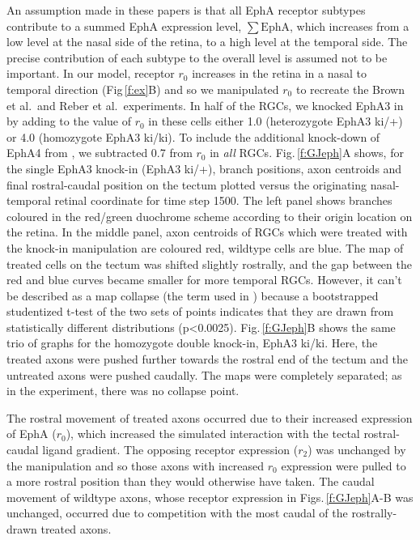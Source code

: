 \documentclass[11pt, a4paper]{article}
\begin{document}
An assumption made in these papers is that all EphA receptor subtypes contribute to a summed EphA expression level, $\sum\mathrm{EphA}$, which increases from a low level at the nasal side of the retina, to a high level at the temporal side.
The precise contribution of each subtype to the overall level is assumed not to be important.
In our model, receptor $r_0$ increases in the retina in a nasal to temporal direction (Fig\,\ref{f:ex}B) and so we manipulated $r_0$ to recreate the Brown et al.~and Reber et al.~experiments.
In half of the RGCs, we knocked EphA3 in by adding to the value of $r_0$ in these cells either 1.0 (heterozygote EphA3 ki/+) or 4.0 (homozygote EphA3 ki/ki).
To include the additional knock-down of EphA4 from \citet{reber_relative_2004}, we subtracted 0.7 from $r_0$ in \emph{all} RGCs.
Fig.\,\ref{f:GJeph}A shows, for the single EphA3 knock-in (EphA3 ki/+), branch positions, axon centroids and final rostral-caudal position on the tectum plotted versus the originating nasal-temporal retinal coordinate for time step 1500.
The left panel shows branches coloured in the red/green duochrome scheme according to their origin location on the retina.
In the middle panel, axon centroids of RGCs which were treated with the knock-in manipulation are coloured red, wildtype cells are blue.
The map of treated cells on the tectum was shifted slightly rostrally, and the gap between the red and blue curves became smaller for more temporal RGCs. However, it can't be described as a map collapse (the term used in \citet{brown_topographic_2000}) because a bootstrapped studentized t-test of the two sets of points indicates that they are drawn from statistically different distributions (p<0.0025).
Fig.\,\ref{f:GJeph}B shows the same trio of graphs for the homozygote double knock-in, EphA3 ki/ki. Here, the treated axons were pushed further towards the rostral end of the tectum and the untreated axons were pushed caudally.
The maps were completely separated; as in the experiment, there was no collapse point.

The rostral movement of treated axons occurred due to their increased expression of EphA ($r_0$), which increased the simulated interaction with the tectal rostral-caudal ligand gradient.
The opposing receptor expression ($r_2$) was unchanged by the manipulation and so those axons with increased $r_0$ expression were pulled to a more rostral position than they would otherwise have taken.
The caudal movement of wildtype axons, whose receptor expression in Figs.\,\ref{f:GJeph}A-B was unchanged, occurred due to competition with the most caudal of the rostrally-drawn treated axons.
\end{document}
